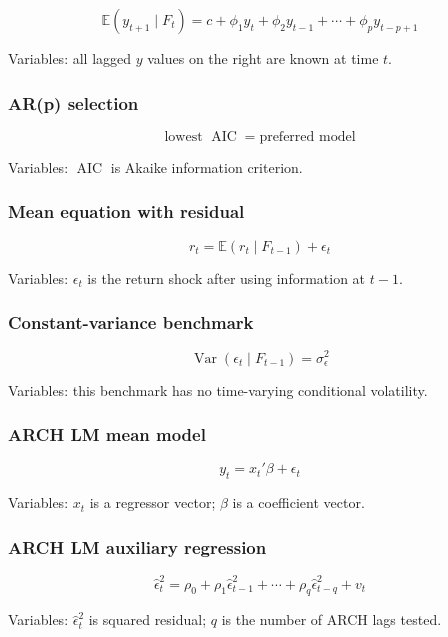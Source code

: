 \documentclass[
  8pt,
  twocolumn]{extarticle}
\begin{document}
\[
\mathbb E(y_{t+1}\mid F_t)=c+\phi_1y_t+\phi_2y_{t-1}+\cdots+\phi_py_{t-p+1}
\]

Variables: all lagged \(y\) values on the right are known at time \(t\).

\subsubsection{AR(p) selection}\label{arp-selection}

\[
\text{lowest }\operatorname{AIC}=\text{preferred model}
\]

Variables: \(\operatorname{AIC}\) is Akaike information criterion.

\subsubsection{Mean equation with
residual}\label{mean-equation-with-residual}

\[
r_t=\mathbb E(r_t\mid F_{t-1})+\epsilon_t
\]

Variables: \(\epsilon_t\) is the return shock after using information at
\(t-1\).

\subsubsection{Constant-variance
benchmark}\label{constant-variance-benchmark}

\[
\operatorname{Var}(\epsilon_t\mid F_{t-1})=\sigma_\epsilon^2
\]

Variables: this benchmark has no time-varying conditional volatility.

\subsubsection{ARCH LM mean model}\label{arch-lm-mean-model}

\[
y_t=x_t'\beta+\epsilon_t
\]

Variables: \(x_t\) is a regressor vector; \(\beta\) is a coefficient
vector.

\subsubsection{ARCH LM auxiliary
regression}\label{arch-lm-auxiliary-regression}

\[
\hat\epsilon_t^2=\rho_0+\rho_1\hat\epsilon_{t-1}^2+\cdots+\rho_q\hat\epsilon_{t-q}^2+v_t
\]

Variables: \(\hat\epsilon_t^2\) is squared residual; \(q\) is the number
of ARCH lags tested.
\end{document}
